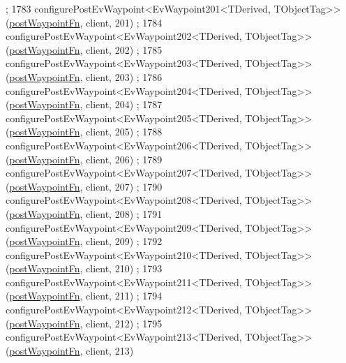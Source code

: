 \begin{DoxyCode}
      ;
1783     configurePostEvWaypoint<EvWaypoint201<TDerived, TObjectTag>>(\hyperlink{classmove__base__z__client_1_1WaypointEventDispatcher_acc538eb7506c13f7cca2268a1742dadd}{postWaypointFn}, client, 201)
      ;
1784     configurePostEvWaypoint<EvWaypoint202<TDerived, TObjectTag>>(\hyperlink{classmove__base__z__client_1_1WaypointEventDispatcher_acc538eb7506c13f7cca2268a1742dadd}{postWaypointFn}, client, 202)
      ;
1785     configurePostEvWaypoint<EvWaypoint203<TDerived, TObjectTag>>(\hyperlink{classmove__base__z__client_1_1WaypointEventDispatcher_acc538eb7506c13f7cca2268a1742dadd}{postWaypointFn}, client, 203)
      ;
1786     configurePostEvWaypoint<EvWaypoint204<TDerived, TObjectTag>>(\hyperlink{classmove__base__z__client_1_1WaypointEventDispatcher_acc538eb7506c13f7cca2268a1742dadd}{postWaypointFn}, client, 204)
      ;
1787     configurePostEvWaypoint<EvWaypoint205<TDerived, TObjectTag>>(\hyperlink{classmove__base__z__client_1_1WaypointEventDispatcher_acc538eb7506c13f7cca2268a1742dadd}{postWaypointFn}, client, 205)
      ;
1788     configurePostEvWaypoint<EvWaypoint206<TDerived, TObjectTag>>(\hyperlink{classmove__base__z__client_1_1WaypointEventDispatcher_acc538eb7506c13f7cca2268a1742dadd}{postWaypointFn}, client, 206)
      ;
1789     configurePostEvWaypoint<EvWaypoint207<TDerived, TObjectTag>>(\hyperlink{classmove__base__z__client_1_1WaypointEventDispatcher_acc538eb7506c13f7cca2268a1742dadd}{postWaypointFn}, client, 207)
      ;
1790     configurePostEvWaypoint<EvWaypoint208<TDerived, TObjectTag>>(\hyperlink{classmove__base__z__client_1_1WaypointEventDispatcher_acc538eb7506c13f7cca2268a1742dadd}{postWaypointFn}, client, 208)
      ;
1791     configurePostEvWaypoint<EvWaypoint209<TDerived, TObjectTag>>(\hyperlink{classmove__base__z__client_1_1WaypointEventDispatcher_acc538eb7506c13f7cca2268a1742dadd}{postWaypointFn}, client, 209)
      ;
1792     configurePostEvWaypoint<EvWaypoint210<TDerived, TObjectTag>>(\hyperlink{classmove__base__z__client_1_1WaypointEventDispatcher_acc538eb7506c13f7cca2268a1742dadd}{postWaypointFn}, client, 210)
      ;
1793     configurePostEvWaypoint<EvWaypoint211<TDerived, TObjectTag>>(\hyperlink{classmove__base__z__client_1_1WaypointEventDispatcher_acc538eb7506c13f7cca2268a1742dadd}{postWaypointFn}, client, 211)
      ;
1794     configurePostEvWaypoint<EvWaypoint212<TDerived, TObjectTag>>(\hyperlink{classmove__base__z__client_1_1WaypointEventDispatcher_acc538eb7506c13f7cca2268a1742dadd}{postWaypointFn}, client, 212)
      ;
1795     configurePostEvWaypoint<EvWaypoint213<TDerived, TObjectTag>>(\hyperlink{classmove__base__z__client_1_1WaypointEventDispatcher_acc538eb7506c13f7cca2268a1742dadd}{postWaypointFn}, client, 213)

\end{DoxyCode}
